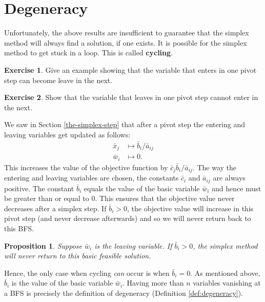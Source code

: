 \documentclass[
]{book}
\newtheorem{proposition}{Proposition}[chapter]
\theoremstyle{definition}
\theoremstyle{definition}
\theoremstyle{definition}
\newtheorem{exercise}{Exercise}[chapter]
\theoremstyle{definition}
\theoremstyle{remark}
\begin{document}
\hypertarget{degeneracy}{%
\section{Degeneracy}\label{degeneracy}}

Unfortunately, the above results are insufficient to guarantee that the simplex method will always
find a solution, if one exists. It is possible for the simplex method to get stuck in a loop. This
is called \textbf{cycling}.

\begin{exercise}
Give an example showing that the variable that enters in one pivot step can become
leave in the next.
\end{exercise}

\begin{exercise}
Show that the variable that leaves in one pivot step cannot enter in the next.
\end{exercise}

We saw in Section \ref{the-simplex-step} that after a pivot step the entering and leaving variables
get updated as follows: \begin{align*} \bar{x}_j & \mapsto \bar{b}_i/\bar{a}_{ij} \\
  \bar{w}_i & \mapsto 0. \end{align*} This increases the value of the objective function by
\(\bar{c}_j \bar{b}_i/\bar{a}_{ij}\). The way the entering and leaving variables are chosen, the
constants \(\bar{c}_i\) and \(\bar{a}_{ij}\) are always positive. The constant \(\bar{b}_i\) equals the
value of the basic variable \(\bar{w}_i\) and hence must be greater than or equal to 0. This ensures
that the objective value never decreases after a simplex step. If \(\bar{b}_i > 0\), the objective
value will increase in this pivot step (and never decrease afterwards) and so we will never return
back to this BFS.

\begin{proposition}
Suppose \(\bar{w}_i\) is the leaving variable. If \(\bar{b}_i > 0\), the simplex
method will never return to this basic feasible solution.
\end{proposition}

Hence, the only case when cycling \emph{can} occur is when \(\bar{b}_i = 0\). As mentioned above,
\(\bar{b}_i\) is the value of the basic variable \(\bar{w}_i\). Having more than \(n\) variables vanishing
at a BFS is precisely the definition of degeneracy (Definition \ref{def:degeneracy}).
\end{document}
